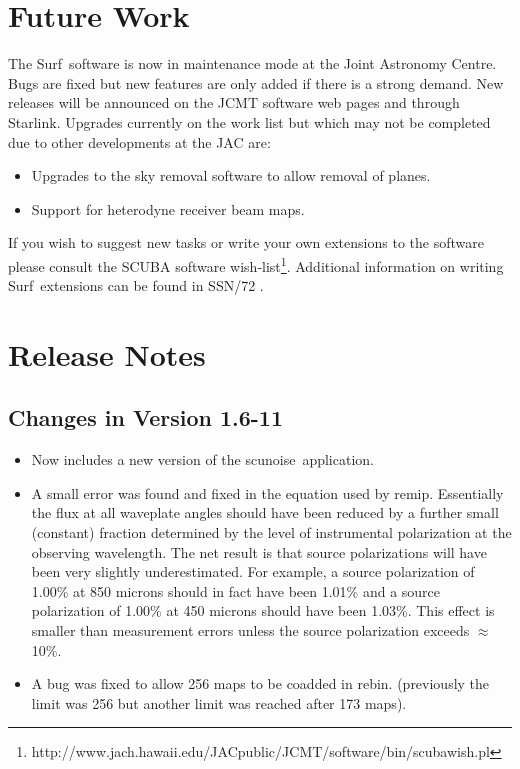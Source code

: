 \documentclass[twoside,11pt]{article}
\newcommand{\scusoft}          {{\sc Surf}}
\newcommand{\task}[1]{{\sf #1}}
\newcommand{\rebin}{\htmlref{\task{rebin}}{REBIN}}
\newcommand{\scunoise}{\htmlref{\task{scunoise}}{SCUNOISE}}
\newcommand{\remip}{\htmlref{\task{remip}}{REMIP}}
\newcommand{\htmladdnormallinkfoot}[2]{#1\footnote{#2}}
\newcommand{\htmlref}[2]{#1}
\newcommand{\xlabel}[1]{}
\renewcommand{\_}{\texttt{\symbol{95}}}
\begin{document}
\section{\xlabel{future}Future Work\label{future}}

The \scusoft\ software is now in maintenance mode at the Joint Astronomy
Centre. Bugs are fixed but new features are only added if there is a strong
demand. New releases will be announced on the JCMT software web pages and
through Starlink.  Upgrades currently on the work list but which may not be
completed due to other developments at the JAC are:

\begin{itemize}

\item Upgrades to the sky removal software to allow removal of planes.

\item Support for heterodyne receiver beam maps.

\end{itemize}

If you wish to suggest new tasks or write your own extensions to the 
software please consult the \htmladdnormallinkfoot{SCUBA software
wish-list}{http://www.jach.hawaii.edu/JACpublic/JCMT/software/bin/scuba\_wish.pl}.
Additional information on writing \scusoft\ extensions can be found
in SSN/72 \cite{ssn72}.


\section{\xlabel{relnotes}Release Notes\label{relnotes}}

\subsection{Changes in Version 1.6-11}

\begin{itemize}
\item Now includes a new version of the \scunoise\ application.
\item  A small error was found and fixed in the equation used by
  \remip. Essentially the flux at all waveplate angles should have been
  reduced by a further small (constant) fraction determined by the
  level of instrumental polarization at the observing wavelength. The
  net result is that source polarizations will have been very slightly
  underestimated. For example, a source polarization of 1.00\% at 850
  microns should in fact have been 1.01\% and a source polarization of
  1.00\% at 450 microns should have been 1.03\%. This effect is smaller
  than measurement errors unless the source polarization exceeds $\approx$
  10\%.
\item A bug was fixed to allow 256 maps to be coadded in \rebin. (previously
  the limit was 256 but another limit was reached after 173 maps).

\end{itemize}
\end{document}
